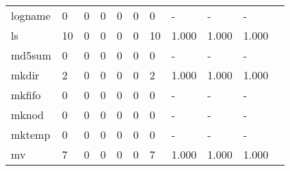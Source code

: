 \begin{longtable}{lp{1.10cm}p{1.10cm}p{1.10cm}p{1.10cm}p{1.10cm}p{1.10cm}p{1.10cm}p{1.10cm}p{1.10cm}p{1.10cm}}
logname   &                      0 &                                  0 &                                 0 &                                0 &                                 0 &                               0 &                              - &                                     - &                                   - \\
ls        &                     10 &                                  0 &                                 0 &                                0 &                                 0 &                              10 &                          1.000 &                                 1.000 &                               1.000 \\
md5sum    &                      0 &                                  0 &                                 0 &                                0 &                                 0 &                               0 &                              - &                                     - &                                   - \\
mkdir     &                      2 &                                  0 &                                 0 &                                0 &                                 0 &                               2 &                          1.000 &                                 1.000 &                               1.000 \\
mkfifo    &                      0 &                                  0 &                                 0 &                                0 &                                 0 &                               0 &                              - &                                     - &                                   - \\
mknod     &                      0 &                                  0 &                                 0 &                                0 &                                 0 &                               0 &                              - &                                     - &                                   - \\
mktemp    &                      0 &                                  0 &                                 0 &                                0 &                                 0 &                               0 &                              - &                                     - &                                   - \\
mv        &                      7 &                                  0 &                                 0 &                                0 &                                 0 &                               7 &                          1.000 &                                 1.000 &                               1.000 \\

\end{longtable}
